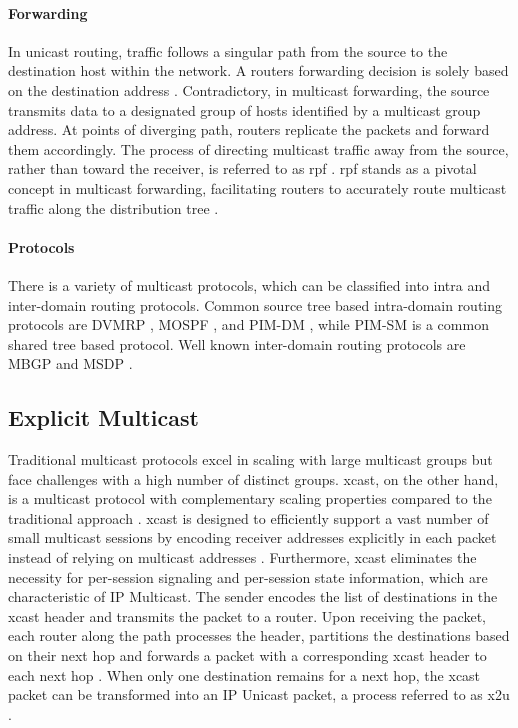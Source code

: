 \paragraph{Forwarding} %
\label{par:Forwarding}
In unicast routing, traffic follows a singular path from the source to the
    destination host within the network.
A routers forwarding decision is solely based on the destination address
    \cite{cisco_ipmc}.
Contradictory, in multicast forwarding, the source transmits data to a
    designated group of hosts identified by a multicast group address.
At points of diverging path, routers replicate the packets and forward them
    accordingly.
The process of directing multicast traffic away from the source, rather than
    toward the receiver, is referred to as \gls{rpf} \cite{cisco_ipmc}.
\gls{rpf} stands as a pivotal concept in multicast forwarding, facilitating
    routers to accurately route multicast traffic along the distribution tree
    \cite{cisco_ipmc}.

\paragraph{Protocols} %
\label{par:Protocols}
There is a variety of multicast protocols, which can be classified into intra
    and inter-domain routing protocols.
Common source tree based intra-domain routing protocols are
    DVMRP \cite{rfc1075_dvmrp},
    MOSPF \cite{rfc1585_mospf}, and
    PIM-DM \cite{rfc3973_pimdm},
    while PIM-SM \cite{rfc7761_pimsm} is a common shared tree based protocol.
Well known inter-domain routing protocols are MBGP \cite{rfc4760_mbgp} and
    MSDP \cite{rfc3618_msdp}.



\subsection{Explicit Multicast}
\label{sub:Xcast}
Traditional multicast protocols excel in scaling with large multicast groups
    but face challenges with a high number of distinct groups.
\gls{xcast}, on the other hand, is a multicast protocol with complementary
    scaling properties compared to the traditional approach \cite{xcast_rfc}.
\gls{xcast} is designed to efficiently support a vast number of small multicast
    sessions by encoding receiver addresses explicitly in each packet instead
    of relying on multicast addresses \cite{xcast_rfc}.
Furthermore, \gls{xcast} eliminates the necessity for per-session signaling and
    per-session state information, which are characteristic of IP Multicast.
The sender encodes the list of destinations in the \gls{xcast} header and
    transmits the packet to a router.
Upon receiving the packet, each router along the path processes the header, 
    partitions the destinations based on their next hop and forwards a packet
    with a corresponding \gls{xcast} header to each next hop \cite{xcast_rfc}.
When only one destination remains for a next hop, the \gls{xcast} packet can be
    transformed into an IP Unicast packet, a process referred to as \gls{x2u}
    \cite{xcast_rfc}.

